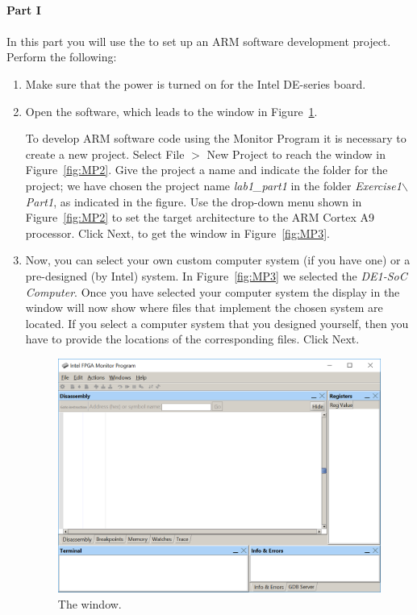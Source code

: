 \documentclass[epsfig,10pt,fullpage]{article}
\begin{document}
~\\
\noindent
{\bf Part I}
~\\
~\\
\noindent
In this part you will use the \productNameMed{} to set up an ARM software development
project.  Perform the following:
\begin{enumerate}
\item Make sure that the power is turned on for the Intel DE-series board.
\item Open the \productNameMed{} software, which leads to the window in Figure~\ref{fig:MP1}.

\noindent
To develop ARM software code using the Monitor Program it is necessary to create a new project.
Select {\sf File $>$ New Project} to reach the window in Figure~\ref{fig:MP2}.
Give the project a name and indicate the folder for the project; 
we have chosen the project name {\it lab1\_part1} in the folder {\it
Exercise1$\backslash$Part1},
as indicated in the figure. Use the drop-down menu shown in Figure~\ref{fig:MP2} to set
the target architecture to the ARM Cortex A9 processor.
Click {\sf Next}, to get the window in Figure~\ref{fig:MP3}.

\item Now, you can select your own custom computer system (if you have one) or a 
pre-designed (by Intel) system. In Figure~\ref{fig:MP3} we selected the {\it DE1-SoC Computer}. 
Once you have selected your computer system the display in the window will now show where 
files that implement the chosen system are located.  If you select a computer system that 
you designed yourself, then you have to provide the locations of the corresponding files. 
Click {\sf Next}.

\begin{figure}[H]
	\begin{center}
	\includegraphics[scale=.67]{figures/figureMP1.png}
	\end{center}
	\caption{The \productNameMed{} window.}
\label{fig:MP1}
\end{figure}


\end{enumerate}
\end{document}

